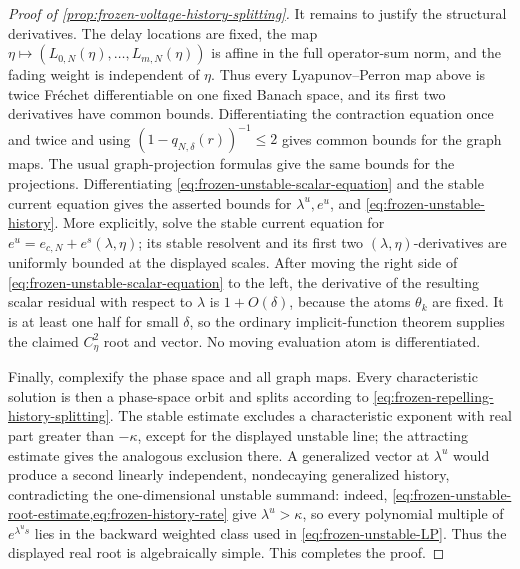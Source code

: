 \begin{proof}[Proof of \cref{prop:frozen-voltage-history-splitting}]
It remains to justify the structural derivatives.  The delay locations are
fixed, the map \(\eta\mapsto(L_{0,N}(\eta),\ldots,L_{m,N}(\eta))\) is
affine in the full operator-sum norm, and the fading weight is independent of
\(\eta\).  Thus every Lyapunov--Perron map above is twice Fr\'{e}chet
differentiable on one fixed Banach space, and its first two derivatives have
common bounds.  Differentiating the contraction equation once and twice and
using \((1-q_{N,\delta}(r))^{-1}\le2\) gives common bounds for the graph
maps.  The usual graph-projection formulas give the same bounds for the
projections.  Differentiating
\cref{eq:frozen-unstable-scalar-equation} and the stable current equation
gives the asserted bounds for \(\lambda^u,e^u\), and
\cref{eq:frozen-unstable-history}.  More explicitly, solve the stable
current equation for \(e^u=e_{c,N}+e^s(\lambda,\eta)\); its stable resolvent
and its first two \((\lambda,\eta)\)-derivatives are uniformly bounded at the
displayed scales.  After moving the right side of
\cref{eq:frozen-unstable-scalar-equation} to the left, the derivative of the
resulting scalar residual with respect to \(\lambda\) is
\(1+O(\delta)\), because the atoms \(\theta_k\) are fixed.  It is at least
one half for small \(\delta\), so the ordinary implicit-function theorem
supplies the claimed \(C^2_\eta\) root and vector.  No moving evaluation atom
is differentiated.

Finally, complexify the phase space and all graph maps.  Every characteristic
solution is then a phase-space orbit and splits according to
\cref{eq:frozen-repelling-history-splitting}.  The stable estimate excludes a
characteristic exponent with real part greater than \(-\kappa\), except for
the displayed unstable line; the attracting estimate gives the analogous
exclusion there.  A generalized vector at \(\lambda^u\) would produce a
second linearly independent, nondecaying generalized history, contradicting
the one-dimensional unstable summand: indeed,
\cref{eq:frozen-unstable-root-estimate,eq:frozen-history-rate} give
\(\lambda^u>\kappa\), so every polynomial multiple of
\(e^{\lambda^us}\) lies in the backward weighted class used in
\cref{eq:frozen-unstable-LP}.  Thus the displayed real root is
algebraically simple.  This completes the proof.
\end{proof}

